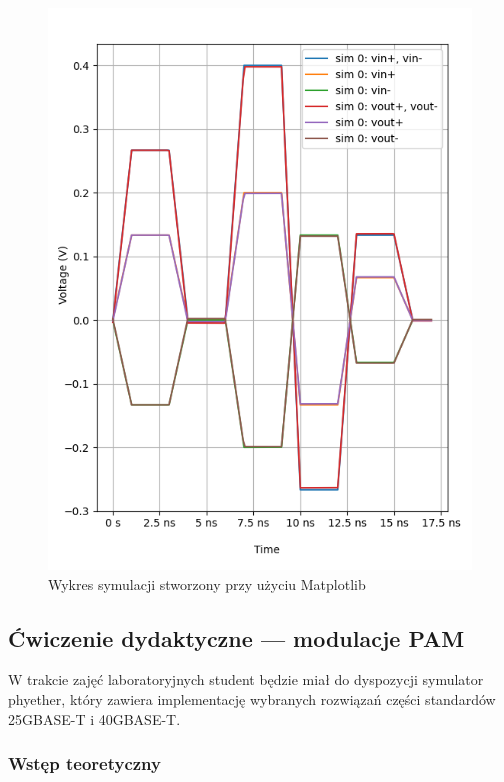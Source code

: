 \begin{figure}[ht]
    \centering
    \includegraphics[scale=0.5]{images/wykres.png}
    \caption{Wykres symulacji stworzony przy użyciu Matplotlib}
    \label{fig:wykres_image}
\end{figure}

\subsection{Ćwiczenie dydaktyczne --- modulacje PAM}

W trakcie zajęć laboratoryjnych student będzie miał do dyspozycji symulator phyether, który zawiera implementację wybranych rozwiązań
części standardów 25GBASE-T i 40GBASE-T.

\subsubsection{Wstęp teoretyczny}

